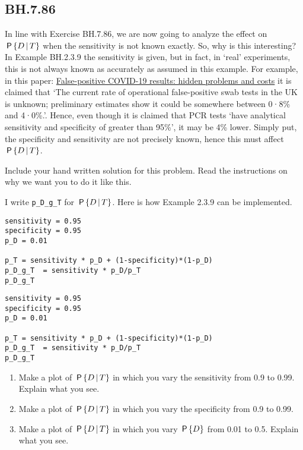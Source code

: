 \subsection{BH.7.86}

In line with Exercise BH.7.86, we are now going to analyze the effect on \(\P{D\given T}\) when the sensitivity is not known exactly.
So, why is this interesting?
In Example BH.2.3.9 the sensitivity is given, but in fact, in `real' experiments, this is not always known as accurately as assumed in this example.
For example, in this paper: \href{https://www.thelancet.com/journals/lanres/article/PIIS2213-2600(20)30453-7/fulltext}{False-positive COVID-19 results: hidden problems and costs} it is claimed that `The current rate of operational false-positive swab tests in the UK is unknown; preliminary estimates show it could be somewhere between 0·8\% and 4·0\%.'.
Hence, even though it is claimed that PCR tests `have analytical sensitivity and specificity of greater than 95\%', it may be 4\% lower.
Simply put, the specificity and sensitivity are not precisely known, hence this must affect \(\P{D\given T}\).




\begin{exercise}
Include your hand written solution for this problem. Read the instructions on why we want you to do it like this.
\end{exercise}


I write \texttt{p\_D\_g\_T} for \(\P{D\given T}\). Here is how  Example 2.3.9 can be implemented.

\begin{verbatim}
sensitivity = 0.95
specificity = 0.95
p_D = 0.01

p_T = sensitivity * p_D + (1-specificity)*(1-p_D)
p_D_g_T  = sensitivity * p_D/p_T
p_D_g_T
\end{verbatim}

\begin{verbatim}
sensitivity = 0.95
specificity = 0.95
p_D = 0.01

p_T = sensitivity * p_D + (1-specificity)*(1-p_D)
p_D_g_T  = sensitivity * p_D/p_T
p_D_g_T
\end{verbatim}


\begin{exercise}
\begin{enumerate}
\item Make a plot of \(\P{D\given T}\) in which you vary the sensitivity from 0.9 to 0.99. Explain what you see.
\item Make a plot of \(\P{D\given T}\) in which you vary the specificity from 0.9 to 0.99.
\item Make a plot of \(\P{D\given T}\) in which you vary \(\P{D}\) from 0.01 to 0.5. Explain what you see.
\end{enumerate}
\end{exercise}
